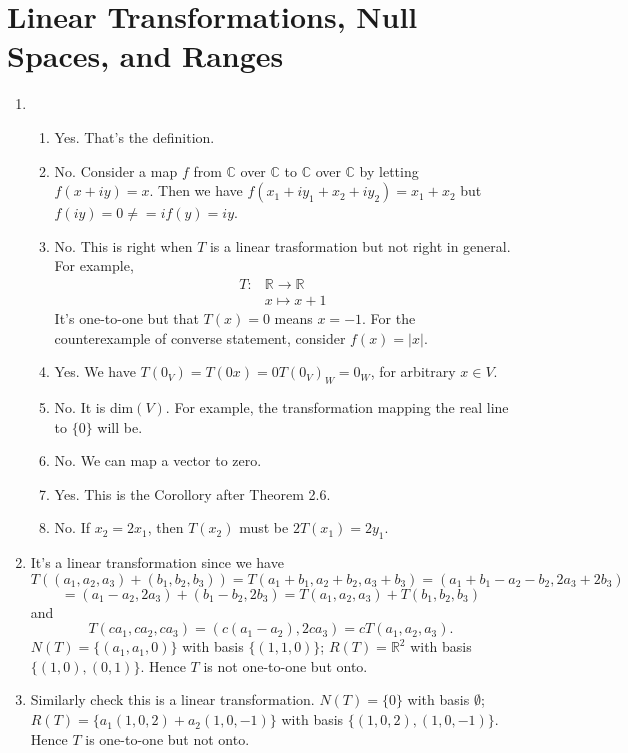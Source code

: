 \section{Linear Transformations, Null Spaces, and Ranges}
\begin{enumerate}
\item \begin{enumerate}
\item Yes. That's the definition.
\item No. Consider a map $f$ from $\mathbb{C}$ over $\mathbb{C}$ to $\mathbb{C}$ over $\mathbb{C}$ by letting $f(x+iy)=x$. Then we have $f(x_1+iy_1+x_2+iy_2)=x_1+x_2$ but $f(iy)=0\neq =if(y)=iy$.
\item No. This is right when $T$ is a linear trasformation but not right in general. For example, 
\begin{align*}
T:&\mathbb{R}\rightarrow \mathbb{R}\\
&x \mapsto x+1
\end{align*}
It's one-to-one but that $T(x)=0$ means $x=-1$. For the counterexample of converse statement, consider $f(x)=|x|$.
\item Yes. We have $T(0_V)=T(0x)=0T(0_V)_W=0_W$, for arbitrary $x\in V$.
\item No. It is dim$(V)$. For example, the transformation mapping the real line to $\{0\}$ will be.
\item No. We can map a vector to zero.
\item Yes. This is the Corollory after Theorem 2.6.
\item No. If $x_2=2x_1$, then $T(x_2)$ must be $2T(x_1)=2y_1$.
\end{enumerate}
\item It's a linear transformation since we have 
\[T((a_1,a_2,a_3)+(b_1,b_2,b_3))=T(a_1+b_1,a_2+b_2,a_3+b_3)=(a_1+b_1-a_2-b_2,2a_3+2b_3)\]
\[=(a_1-a_2,2a_3)+(b_1-b_2,2b_3)=T(a_1,a_2,a_3)+T(b_1,b_2,b_3)\]
and 
\[T(ca_1,ca_2,ca_3)=(c(a_1-a_2),2ca_3)=cT(a_1,a_2,a_3).\]
$N(T)=\{(a_1,a_1,0)\}$ with basis $\{(1,1,0)\}$; $R(T)=\mathbb{R}^2$ with basis $\{(1,0),(0,1)\}$. Hence $T$ is not one-to-one but onto.
\item Similarly check this is a linear transformation. $N(T)=\{0\}$ with basis $\emptyset $; $R(T)=\{a_1(1,0,2)+a_2(1,0,-1)\}$ with basis $\{(1,0,2),(1,0,-1)\}$. Hence $T$ is one-to-one but not onto.

\end{enumerate}
